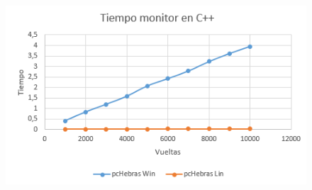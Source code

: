 \documentclass[12pt,letterpaper]{article}
\begin{document}
\begin{center}
	\begin{figure}
		\includegraphics[scale=1.3]{TiempoMonitorC.png}
	\end{figure}
\end{center}
\end{document}
